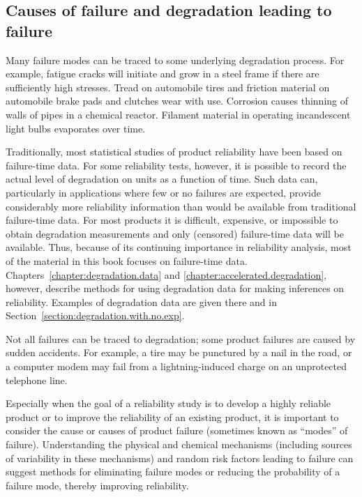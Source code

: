 \subsection{Causes of failure and degradation leading to failure}
\label{section:def.of.degradation}

Many failure modes can be traced to some underlying degradation
process. For example, fatigue cracks will initiate and grow in a steel
frame if there are sufficiently high stresses.  Tread on
automobile tires and friction material on automobile brake pads and
clutches wear with use.  Corrosion causes thinning of walls of pipes in
a chemical reactor.  Filament material in operating incandescent
light bulbs evaporates over time.

Traditionally, most statistical studies of product reliability have
been based on failure-time data. For some reliability tests,
however, it is possible to record the actual level of degradation on
units as a function of time. Such data can, particularly in
applications where few or no failures are expected, provide
considerably more reliability information than would be available from
traditional failure-time data.  For most products it is difficult,
expensive, or impossible to obtain degradation measurements and only
(censored) failure-time data will be available.  Thus, because of
its continuing importance in reliability analysis, most of the
material in this book focuses on failure-time data.
Chapters~\ref{chapter:degradation.data} and
\ref{chapter:accelerated.degradation}, however, describe methods for
using degradation data for making inferences on reliability. Examples of
degradation data are given there 
and in Section~\ref{section:degradation.with.no.exp}.

Not all failures can be traced to degradation; some product failures
are caused by sudden accidents. For example, a tire may be punctured
by a nail in the road, or a computer modem may fail from a
lightning-induced charge on an unprotected telephone line.

Especially when the goal of a reliability study is to develop a highly
reliable product or to improve the reliability of an existing product,
it is important to consider the cause or causes of product failure
(sometimes known as ``modes'' of failure).  Understanding the physical
and chemical mechanisms (including sources of variability in these
mechanisms) and random risk factors leading to failure can suggest
methods for eliminating failure modes or reducing the probability of a
failure mode, thereby improving reliability.

